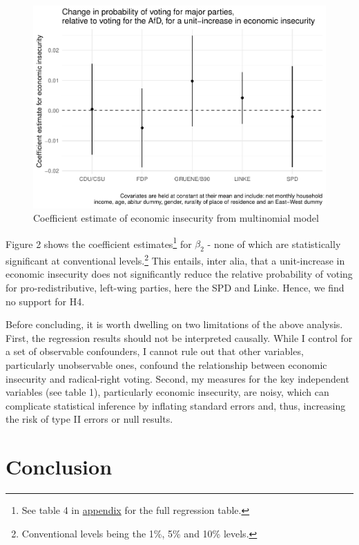 \documentclass[
]{article}
\begin{document}
\begin{figure}
\centering
\includegraphics{AVCD_Final-Assignment-Edenhofer_files/figure-latex/multinomial-model-plot-1.pdf}
\caption{Coefficient estimate of economic insecurity from multinomial
model}
\end{figure}

Figure 2 shows the coefficient estimates\footnote{See table 4 in
  \protect\hyperlink{appendix}{appendix} for the full regression table.}
for \(\beta_{2}\) - none of which are statistically significant at
conventional levels.\footnote{Conventional levels being the 1\%, 5\% and
  10\% levels.} This entails, inter alia, that a unit-increase in
economic insecurity does not significantly reduce the relative
probability of voting for pro-redistributive, left-wing parties, here
the SPD and Linke. Hence, we find no support for H4.

Before concluding, it is worth dwelling on two limitations of the above
analysis. First, the regression results should not be interpreted
causally. While I control for a set of observable confounders, I cannot
rule out that other variables, particularly unobservable ones, confound
the relationship between economic insecurity and radical-right voting.
Second, my measures for the key independent variables (see table 1),
particularly economic insecurity, are noisy, which can complicate
statistical inference by inflating standard errors and, thus, increasing
the risk of type II errors or null results.

\hypertarget{conclusion}{%
\section{Conclusion}\label{conclusion}}
\end{document}
